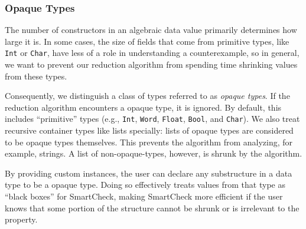 \documentclass{sigplanconf}
\newenvironment{code}{\begin{alltt}}{\end{alltt}}
\newcommand{\ttp}[1]{\texttt{#1}}
\begin{document}


\subsubsection{Opaque Types}\label{sec:base}

The number of constructors in an algebraic data value primarily determines how
large it is.  In some cases, the size of fields that come from primitive
types, like \ttp{Int} or \ttp{Char}, have less of a role in understanding a
counterexample, so in general, we want to prevent our reduction algorithm from
spending time shrinking values from these types.

Consequently, we distinguish a class of types referred to as \emph{opaque
  types}.  If the reduction algorithm encounters a opaque type, it is ignored.
By default, this includes ``primitive'' types (e.g., \ttp{Int}, \ttp{Word},
\ttp{Float}, \ttp{Bool}, and \ttp{Char}).  We also treat recursive container
types like lists specially: lists of opaque types are considered to be opaque
types themselves.  This prevents the algorithm from analyzing, for example,
strings.  A list of non-opaque-types, however, is shrunk by the algorithm.

By providing custom instances, the user can declare any substructure in a data
type to be a opaque type.  Doing so effectively treats values from that type as
``black boxes'' for SmartCheck, making SmartCheck more efficient if the user
knows that some portion of the structure cannot be shrunk or is irrelevant to
the property.
\end{document}
